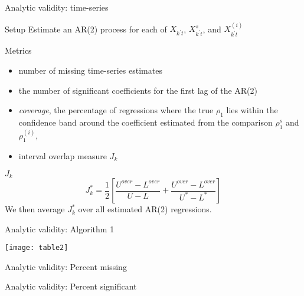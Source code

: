 \begin{frame}{Analytic validity: time-series}
\begin{block}{Setup}
Estimate an AR(2) process for each of 
$X_{k^\prime t}$, $X_{k^\prime t}^{s}$, and $X_{k^\prime t}^{(i)}$
\end{block}
\begin{block}{Metrics}
\begin{itemize}
\item  number of missing time-series estimates %
\item the number of significant coefficients for the first lag of the AR(2)
\item \emph{coverage}, the 
percentage of regressions where the true $\rho_1$ lies within the confidence band around the 
coefficient estimated from the comparison $\rho_1^{s}$ and $\rho_1^{(i)}$, 
\item interval overlap measure $J_k$ \cite{tas2006}
\end{itemize}
\end{block}
\end{frame}

\begin{frame}{$J_k$}
$$
J_k^{*} = \frac{1}{2} \left [ \frac{U^{over} - L^{over}}{U-L} + \frac{U^{over} - L^{over}}{U^*-L ^*}        \right ]
$$
We then average $J_k^{*}$ over all estimated AR(2) regressions.
\end{frame}

\begin{frame}[fragile]{Analytic validity: Algorithm 1}
\begin{center}


\texttt{[image: table2]}

\end{center}
\end{frame}


\begin{frame}[fragile]{Analytic validity: Percent missing}
	\begin{center}
		\footnotesize
		
		
		
	\end{center}
\end{frame}




\begin{frame}[fragile]{Analytic validity: Percent significant}
	\begin{center}
		\footnotesize
		
		
		
	\end{center}
\end{frame}


